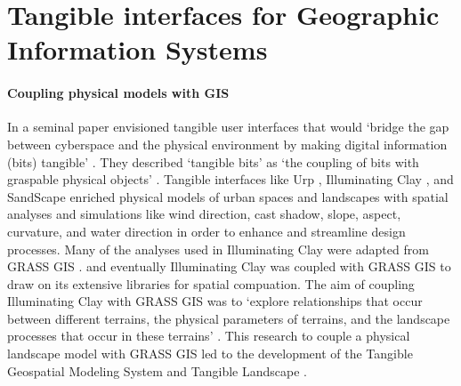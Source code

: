 \documentclass{article}
\begin{document}

\section{Tangible interfaces for Geographic Information Systems}



\paragraph{Coupling physical models with GIS}

In a seminal paper \citeauthor{Ishii1997} envisioned tangible user interfaces that would 
`bridge the gap between cyberspace and the physical environment by making digital information (bits) tangible' \citeyearpar{Ishii1997}.
They described `tangible bits' as `the coupling of bits with graspable physical objects' \citep{Ishii1997}. 
%
Tangible interfaces like 
Urp \citep{Underkoffler1999}, Illuminating Clay \citep{Piper2002a}, and SandScape \citep{Ratti2004} 
enriched physical models of urban spaces and landscapes with spatial analyses and simulations 
like wind direction, cast shadow, slope, aspect, curvature, and water direction
in order to enhance and streamline design processes. 
%
Many of the analyses used in Illuminating Clay were adapted from GRASS GIS \citep{Piper2002a}. 
and eventually 
Illuminating Clay was coupled with GRASS GIS 
to draw on its extensive libraries for spatial compuation. 
The aim of coupling Illuminating Clay with GRASS GIS was to 
`explore relationships that occur between different terrains, the physical parameters of terrains, and the landscape processes that occur in these terrains' \citep{Mitasova2006}. 
%
This research to couple a physical landscape model with GRASS GIS led to the development of 
the Tangible Geospatial Modeling System \citep{Tateosian2010} and Tangible Landscape \citep{Petrasova2014,Petrasova2015}.
\end{document}
